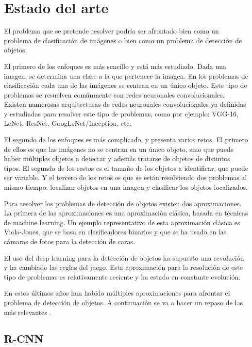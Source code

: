 \section{Estado del arte}
\label{sec:estado_del_arte}

El problema que se pretende resolver podría ser afrontado bien como un problema de clasificación de imágenes o bien como un problema de detección de objetos.

El primero de los enfoques es más sencillo y está más estudiado. Dada una imagen, se determina una clase a la que pertenece la imagen. En los problemas de clasificación cada una de las imágenes se centran en un único objeto. Este tipo de problemas se resuelven comúnmente con redes neuronales convolucionales. Existen numerosas arquitecturas de redes neuronales convolucionales ya definidas y estudiadas para resolver este tipo de problemas, como por ejemplo: VGG-16, LeNet, ResNet, GoogLeNet/Inception, etc.

El segundo de los enfoques es más complicado, y presenta varios retos. El primero de ellos es que las imágenes no se centran en un único objeto, sino que puede haber múltiples objetos a detectar y además tratarse de objetos de distintos tipos. El segundo de los restos es el tamaño de los objetos a identificar, que puede ser variable. Y el tercero de los retos es que se están resolviendo dos problemas al mismo tiempo: localizar objetos en una imagen y clasificar los objetos localizados.

Para resolver los problemas de detección de objetos existen dos aproximaciones. La primera de las aproximaciones es una aproximación clásica, basada en técnicas de machine learning. Un ejemplo representativo de esta aproximación clásica es Viola-Jones, que se basa en clasificadores binarios y que se ha usado en las cámaras de fotos para la detección de caras.

El uso del deep learning para la detección de objetos ha supuesto una revolución y ha cambiado las reglas del juego. Esta aproximación para la resolución de este tipo de problemas es relativamente reciente y ha estado en constante evolución.

En estos últimos años han habido múltiples aproximaciones para afrontar el problema de detección de objetos. A continuación se va a hacer un repaso de las más relevantes \cite{s2_stateofart1} \cite{s2_stateofart2} \cite{s2_stateofart5} \cite{s2_stateofart6} \cite{s2_stateofart7}.

\subsection*{R-CNN}

